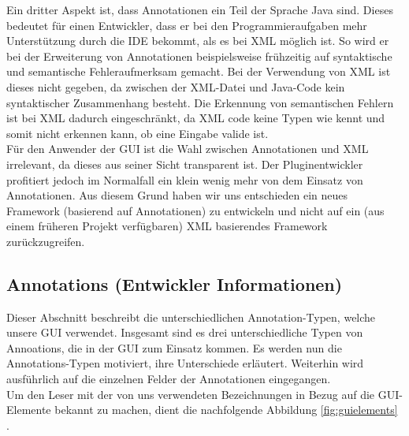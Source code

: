 \documentclass[a4paper, 11pt]{article} %
\begin{document}
\newpage
Ein dritter Aspekt ist, dass Annotationen ein Teil der Sprache Java sind. Dieses bedeutet für einen Entwickler, dass er bei den Programmieraufgaben mehr Unterstützung durch die IDE bekommt, als es bei XML möglich ist. So wird er bei der Erweiterung von Annotationen beispielsweise frühzeitig auf syntaktische und semantische Fehleraufmerksam gemacht. Bei der Verwendung von XML ist dieses nicht gegeben, da zwischen der XML-Datei und Java-Code kein syntaktischer Zusammenhang besteht. Die Erkennung von semantischen Fehlern ist bei XML dadurch eingeschränkt, da XML code keine Typen wie kennt und somit nicht erkennen kann, ob eine Eingabe valide ist.\\

Für den Anwender der GUI ist die Wahl zwischen Annotationen und XML irrelevant, da dieses aus seiner Sicht transparent ist. Der Pluginentwickler profitiert jedoch im Normalfall ein klein wenig mehr von dem Einsatz von Annotationen. Aus diesem Grund haben wir uns entschieden ein neues Framework (basierend auf Annotationen) zu entwickeln und nicht auf ein (aus einem früheren Projekt verfügbaren) XML basierendes Framework zurückzugreifen.



\newpage
\subsection{Annotations (Entwickler Informationen)} %
\label{sub:annotations}
Dieser Abschnitt beschreibt die unterschiedlichen Annotation-Typen, welche unsere GUI verwendet. Insgesamt sind es drei unterschiedliche Typen von Annoations, die in der GUI zum Einsatz kommen. Es werden nun die Annotations-Typen motiviert, ihre Unterschiede erläutert. Weiterhin wird ausführlich auf die einzelnen Felder der Annotationen eingegangen.\\

Um den Leser mit der von uns verwendeten Bezeichnungen in Bezug auf die GUI-Elemente bekannt zu machen, dient die nachfolgende Abbildung \ref{fig:guielements} . 
\end{document}
